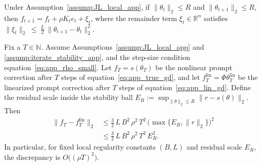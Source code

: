 \documentclass[10pt,a4paper]{amsart}
\def\eqref#1{equation~\ref{#1}}
\begin{document}
\begin{lemma}
\label{lem:nonlinear_prompt_recursion_app}
Under Assumption~\ref{assump:JL_local_app}, if $\|\theta_t\|_2\le R$ and $\|\theta_{t+1}\|_2\le R$, then $f_{t+1}=f_t+\rho K_t e_t + \xi_t$, where the remainder term $\xi_t\in\mathbb{R}^n$ satisfies $\|\xi_t\|_2 \ \le\ \frac{L}{2}\,\|\theta_{t+1}-\theta_t\|_2^2$.
\end{lemma}

\begin{theorem}\label{thm:finite_step_deviation_prompt_app}
Fix a $T\in\mathbb{N}$. Assume Assumptions~\ref{assump:JL_local_app} and \ref{assump:iterate_stability_app},
and the step-size condition \eqref{eq:app_rho_small}. Let $f_T=s(\theta_T)$ be the nonlinear prompt correction after
$T$ steps of \eqref{eq:app_true_gd}, and let $f_T^{\mathrm{lin}}=\Phi\theta_T^{\mathrm{lin}}$ be the linearized prompt
correction after $T$ steps of \eqref{eq:app_lin_gd}. Define the residual scale inside the stability ball $E_R:=\sup_{\|\theta\|_2\le R}\|r-s(\theta)\|_2.$
Then
\begin{align}
\|f_T-f_T^{\mathrm{lin}}\|_2 &\le \frac{3}{2}\,L\,B^2\,\rho^2\,T^2\, \bigl(\max\{E_R,\|r\|_2\}\bigr)^2 \\
&\le \frac{3}{2}\,L\,B^2\,\rho^2\,T^2\,E_R^2.
\label{eq:app_finite_step_deviation_bound}
\end{align}
In particular, for fixed local regularity constants $(B,L)$ and residual scale $E_R$, the discrepancy is
$O\bigl((\rho T)^2\bigr)$.
\end{theorem}
\end{document}

